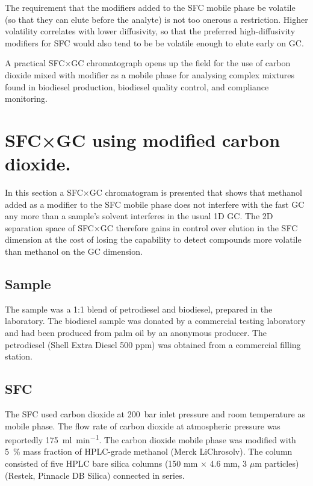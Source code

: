 The requirement that the modifiers added to the SFC mobile phase be volatile (so
that they can elute before the analyte) is not too onerous a restriction. Higher
volatility correlates with lower diffusivity, so that the preferred
high-diffusivity modifiers for SFC  would also tend to be be volatile enough to
elute early on GC. 

A practical SFC×GC chromatograph opens up the field for the use of carbon
dioxide mixed with modifier as a mobile phase for analysing complex mixtures
found in biodiesel production, biodiesel quality control, and compliance
monitoring.

\section[SFC×GC with modifier]{SFC×GC using modified carbon dioxide.}

In this section a SFC×GC chromatogram is presented that shows that methanol
added as a modifier to the SFC mobile phase does not interfere with the fast GC
any more than a sample's solvent interferes in the usual 1D GC. The 2D
separation space of SFC×GC therefore gains in control over elution in the SFC
dimension at the cost of losing the capability to detect compounds
more volatile than methanol on the GC dimension.

\subsection{Sample}

The sample was a 1:1 blend of petrodiesel and biodiesel, prepared in the
laboratory. The biodiesel sample was donated by a commercial testing laboratory
and had been produced from palm oil by an anonymous producer. The petrodiesel
(Shell Extra Diesel 500 ppm) was obtained from a commercial filling station.

\subsection{SFC}

The SFC used carbon dioxide at \SI{200}{\bar} inlet pressure and room
temperature as mobile phase. The flow rate of carbon dioxide at atmospheric
pressure was reportedly \SI{175}{\milli\litre\per\minute}. The carbon dioxide
mobile phase was modified with \SI{5}{\percent} mass fraction of HPLC-grade
methanol (Merck LiChrosolv). The column consisted of five HPLC bare silica
columns (150 mm $\times$ 4.6 mm, 3 $\mu$m particles) (Restek, Pinnacle DB
Silica) connected in series.


